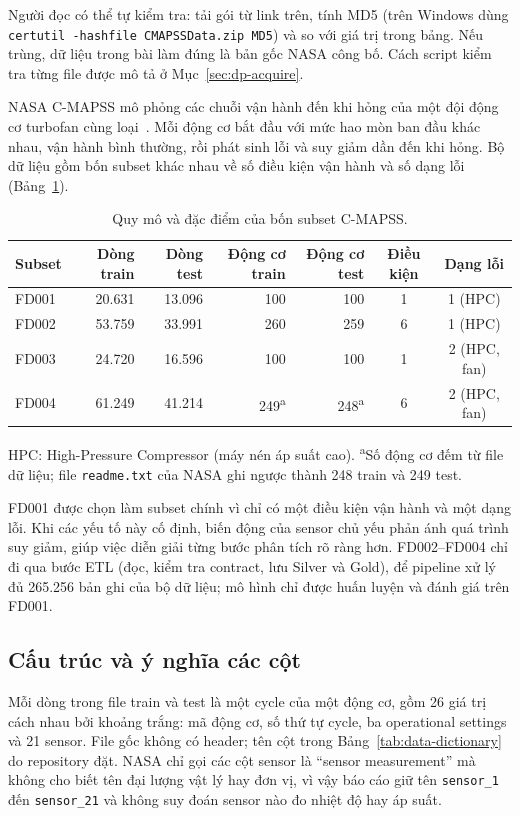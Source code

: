 Người đọc có thể tự kiểm tra: tải gói từ link trên, tính MD5 (trên Windows dùng
\texttt{certutil -hashfile CMAPSSData.zip MD5}) và so với giá trị trong bảng. Nếu
trùng, dữ liệu trong bài làm đúng là bản gốc NASA công bố. Cách script kiểm tra từng
file được mô tả ở Mục~\ref{sec:dp-acquire}.

NASA C-MAPSS mô phỏng các chuỗi vận hành đến khi hỏng của một đội động cơ
turbofan cùng loại~\cite{nasaCmapssDataset,saxena2008damage}. Mỗi động cơ bắt đầu
với mức hao mòn ban đầu khác nhau, vận hành bình thường, rồi phát sinh lỗi và
suy giảm dần đến khi hỏng. Bộ dữ liệu gồm bốn subset khác nhau về số điều kiện
vận hành và số dạng lỗi (Bảng~\ref{tab:data}).

\begin{table}[H]
\centering
\caption[Quy mô C-MAPSS]{Quy mô và đặc điểm của bốn subset C-MAPSS.}
\label{tab:data}
\small
\begin{tabular}{l r r r r c c}
\toprule
Subset & Dòng train & Dòng test & Động cơ train & Động cơ test & Điều kiện & Dạng lỗi\\\midrule
FD001 & 20.631 & 13.096 & 100 & 100 & 1 & 1 (HPC)\\
FD002 & 53.759 & 33.991 & 260 & 259 & 6 & 1 (HPC)\\
FD003 & 24.720 & 16.596 & 100 & 100 & 1 & 2 (HPC, fan)\\
FD004 & 61.249 & 41.214 & 249\textsuperscript{a} & 248\textsuperscript{a} & 6 & 2 (HPC, fan)\\\bottomrule
\end{tabular}

\vspace{0.3em}
\begin{minipage}{0.95\linewidth}\footnotesize
HPC: High-Pressure Compressor (máy nén áp suất cao). \textsuperscript{a}Số động
cơ đếm từ file dữ liệu; file \texttt{readme.txt} của NASA ghi ngược thành 248
train và 249 test.
\end{minipage}
\end{table}

FD001 được chọn làm subset chính vì chỉ có một điều kiện vận hành và một dạng
lỗi. Khi các yếu tố này cố định, biến động của sensor chủ yếu phản ánh quá trình
suy giảm, giúp việc diễn giải từng bước phân tích rõ ràng hơn. FD002--FD004 chỉ đi
qua bước ETL (đọc, kiểm tra contract, lưu Silver và Gold), để pipeline xử lý đủ
265.256 bản ghi của bộ dữ liệu; mô hình chỉ được huấn luyện và đánh giá trên FD001.

\subsection{Cấu trúc và ý nghĩa các cột}
Mỗi dòng trong file train và test là một cycle của một động cơ, gồm 26 giá trị
cách nhau bởi khoảng trắng: mã động cơ, số thứ tự cycle, ba operational settings
và 21 sensor. File gốc không có header; tên cột trong Bảng~\ref{tab:data-dictionary}
do repository đặt. NASA chỉ gọi các cột sensor là ``sensor measurement'' mà
không cho biết tên đại lượng vật lý hay đơn vị, vì vậy báo cáo giữ tên
\texttt{sensor\_1} đến \texttt{sensor\_21} và không suy đoán sensor nào đo nhiệt
độ hay áp suất.

